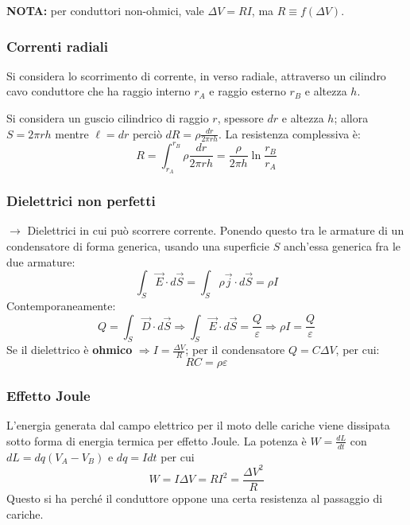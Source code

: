 \documentclass[10pt, a4paper]{scrartcl}
\numberwithin{equation}{subsection}
\theoremstyle{style1}
\begin{document}
\noindent \textbf{NOTA:} per conduttori non-ohmici, vale $\Delta V=RI$, ma $R\equiv f(\Delta V)$. 
\subsubsection{Correnti radiali}

Si considera lo scorrimento di corrente, in verso radiale, attraverso un cilindro cavo conduttore che ha raggio interno $r_A$ e raggio esterno $r_B$ e altezza $h$.

Si considera un guscio cilindrico di raggio $r$, spessore $dr$ e altezza $h$; allora $S = 2 \pi r h$ mentre $\ell = dr$ perci\`o $dR = \rho  \frac{dr}{2\pi r h}$. La resistenza complessiva \`e:
\begin{equation}
	R = \int_{r_A} ^{r_B} \rho  \frac{dr}{2\pi r h} = \frac{\rho }{2 \pi h}\ln \frac{r_B}{r_A} 
\end{equation}

\subsubsection{Dielettrici non perfetti}

$\to$ Dielettrici in cui pu\`o scorrere corrente. Ponendo questo tra le armature di un condensatore di forma generica, usando una superficie $S$ anch'essa generica fra le due armature:
\begin{equation}
	\int_{S} \vec{E}\cdot d\vec{S} = \int_{S} \rho  \vec{j}\cdot d\vec{S} = \rho I
\end{equation}
Contemporaneamente:
\begin{equation}
	Q = \int_{S} \vec{D}\cdot d\vec{S}\Rightarrow \int_{S} \vec{E}\cdot d\vec{S} = \frac{Q}{\varepsilon } \Rightarrow \rho I = \frac{Q}{\varepsilon }
\end{equation}
Se il dielettrico \`e \textbf{ohmico} $\Rightarrow I = \frac{\Delta V}{R}$; per il condensatore $Q = C\Delta V$, per cui:
\begin{equation}
	RC = \rho \varepsilon 
\end{equation}
\subsubsection{Effetto Joule}
L'energia generata dal campo elettrico per il moto delle cariche viene dissipata sotto forma di energia termica per effetto Joule. La potenza \`e $W = \frac{dL}{dt}$ con $dL = dq (V_A-V_B)$ e $dq = I dt$ per cui
\begin{equation}
	W = I \Delta V = RI^2 = \frac{\Delta V^2}{R}
\end{equation}
Questo si ha perch\'e il conduttore oppone una certa resistenza al passaggio di cariche.
\end{document}
